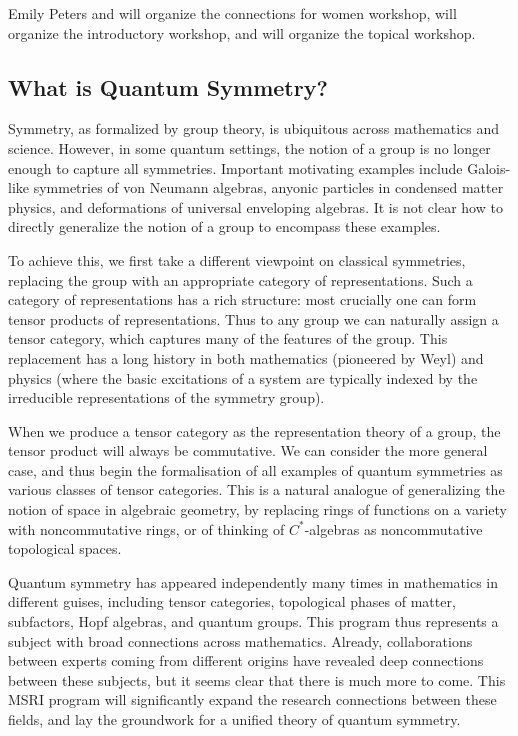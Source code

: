 \documentclass[11pt]{article}
\begin{document}
Emily Peters and \nn{} will organize the connections for women workshop, \nn{} will organize the introductory workshop, and \nn{} will organize the topical workshop.


\subsection{What is Quantum Symmetry?}

Symmetry, as formalized by group theory, is ubiquitous across mathematics and science.  However, in some quantum settings, the notion of a group is no longer enough to capture all symmetries.  Important motivating examples include Galois-like symmetries of von Neumann algebras, anyonic particles in condensed matter physics, and deformations of universal enveloping algebras. It is not clear how to directly generalize the notion of a group to encompass these examples.

To achieve this, we first take a different viewpoint on classical symmetries, replacing the group with an appropriate category of representations.  Such a category of representations has a rich structure: most crucially one can form tensor products of representations.  Thus to any group we can naturally assign a tensor category, which captures many of the features of the group. This replacement has a long history in both mathematics (pioneered by Weyl) and physics (where the basic excitations of a system are typically indexed by the irreducible representations of the symmetry group).

When we produce a tensor category as the representation theory of a group, the tensor product will always be commutative. We can consider the more general case, and thus begin the formalisation of all examples of quantum symmetries as various classes of tensor categories. This is a natural analogue of generalizing the notion of space in algebraic geometry, by replacing rings of functions on a variety with noncommutative rings, or of thinking of $C^*$-algebras as noncommutative topological spaces.

Quantum symmetry has appeared independently many times in mathematics in different guises, including tensor categories, topological phases of matter, subfactors, Hopf algebras, and quantum groups. This program thus represents a subject with broad connections across mathematics. Already, collaborations between experts coming from different origins have revealed deep connections between these subjects, but it seems clear that there is much more to come. This MSRI program will significantly expand the research connections between these fields, and lay the groundwork for a unified theory of quantum symmetry.
\end{document}
